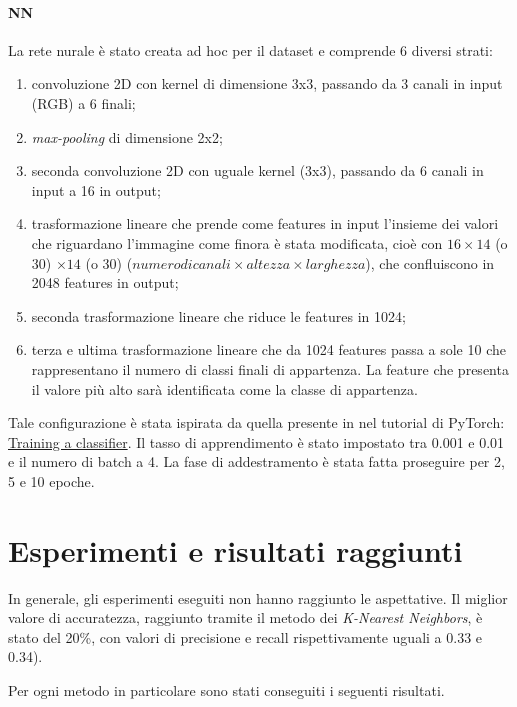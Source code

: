 \documentclass[11pt, a4paper, titlepage]{article}
\begin{document}
\paragraph{NN}
La rete nurale è stato creata ad hoc per il dataset e comprende 6 diversi strati:
\begin{enumerate}
    \item convoluzione 2D con kernel di dimensione 3x3, passando da 3 canali in input (RGB) a 6 finali;
    \item \emph{max-pooling} di dimensione 2x2;
    \item seconda convoluzione 2D con uguale kernel (3x3), passando da 6 canali in input a 16 in output;
    \item trasformazione lineare che prende come features in input l'insieme dei valori che riguardano l'immagine come finora è stata modificata, cioè con $16 \times 14$ (o 30) $\times 14$ (o 30) ($numero di canali \times altezza \times larghezza$), che confluiscono in 2048 features in output;
    \item seconda trasformazione lineare che riduce le features in 1024;
    \item terza e ultima trasformazione lineare che da 1024 features passa a sole 10 che rappresentano il numero di classi finali di appartenza. La feature che presenta il valore più alto sarà identificata come la classe di appartenza.
\end{enumerate}
Tale configurazione è stata ispirata da quella presente in nel tutorial di PyTorch: \href{https://pytorch.org/tutorials/beginner/blitz/cifar10_tutorial.html}{Training a classifier}. Il tasso di apprendimento è stato impostato tra 0.001 e 0.01 e il numero di batch a 4. La fase di addestramento è stata fatta proseguire per 2, 5 e 10 epoche. 

\section{Esperimenti e risultati raggiunti}
In generale, gli esperimenti eseguiti non hanno raggiunto le aspettative. Il miglior valore di accuratezza, raggiunto tramite il metodo dei \emph{K-Nearest Neighbors}, è stato del 20\%, con valori di precisione e recall rispettivamente uguali a 0.33 e 0.34).

\medskip
Per ogni metodo in particolare sono stati conseguiti i seguenti risultati. 
\end{document}
